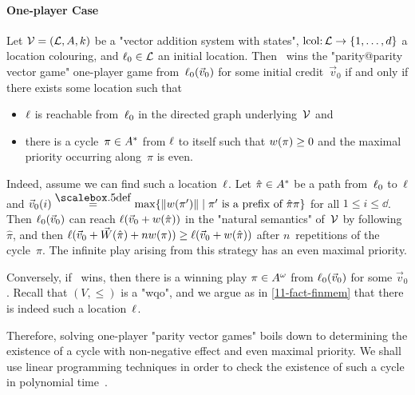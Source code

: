 \paragraph{One-player Case}
Let $\mathcal V=(\mathcal L,A,k)$ be a "vector addition system with states",
$\mathrm{lcol}{:}\,\mathcal L\to\{1,\dots,d\}$ a location colouring, and
$\ell_0\in\mathcal L$ an initial location.  Then \Eve\ wins the
"parity@parity vector game" one-player game from~$\ell_0(\vec v_0)$
for some initial credit~$\vec v_0$ if and only if there exists some
location such that
\begin{itemize}
\item $\ell$ is reachable from~$\ell_0$ in the directed graph
  underlying~$\mathcal V$ and
\item there is a cycle~$\pi\in A^\ast$ from $\ell$ to itself such
  that $w(\pi)\geq 0$ and the maximal priority occurring
  along~$\pi$ is even.
\end{itemize}
Indeed, assume we can find such a location~$\ell$.  Let
$\hat\pi\in A^\ast$ be a path from~$\ell_0$ to~$\ell$ and $\vec
v_0(i)\eqdef\max\{\|\weight(\pi')\|\mid\pi'\text{ is a prefix of
}\hat\pi\pi\}$ for all $1\leq i\leq\dd$.  Then $\ell_0(\vec v_0)$ can
reach $\ell(\vec v_0+w(\hat\pi))$ in the "natural semantics"
of~$\mathcal V$ by following~$\hat\pi$, and then $\ell(\vec v_0+\vec
W(\hat\pi)+nw(\pi))\geq \ell(\vec v_0+w(\hat\pi))$ after
$n$~repetitions of the cycle~$\pi$.  The infinite play arising from
this strategy has an even maximal priority.

Conversely, if \Eve\ wins, then there is a winning play
$\pi\in A^\omega$ from $\ell_0(\vec v_0)$ for some $\vec v_0$.
Recall that $(V,{\leq})$ is a "wqo", and we argue as in
\cref{11-fact-finmem} that there is indeed such a location~$\ell$.

\medskip
Therefore, solving one-player "parity vector games" boils down to
determining the existence of a cycle with non-negative effect and even
maximal priority.  We shall use linear programming techniques in order
to check the existence of such a cycle in polynomial
time~\cite{Kosaraju&Sullivan:1988}.


